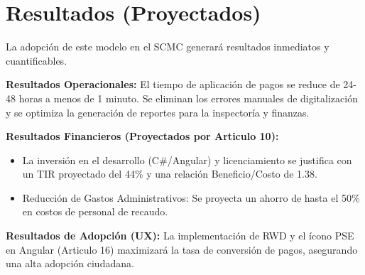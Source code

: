 \section{Resultados (Proyectados)}
La adopción de este modelo en el SCMC generará resultados inmediatos y cuantificables.

\textbf{Resultados Operacionales:} El tiempo de aplicación de pagos se reduce de 24-48 horas a menos de 1 minuto. Se eliminan los errores manuales de digitalización y se optimiza la generación de reportes para la inspectoría y finanzas.

\textbf{Resultados Financieros (Proyectados por Articulo 10):}
\begin{itemize}
    \item La inversión en el desarrollo (C\#/Angular) y licenciamiento se justifica con un TIR proyectado del 44\% y una relación Beneficio/Costo de 1.38.
    \item Reducción de Gastos Administrativos: Se proyecta un ahorro de hasta el 50\% en costos de personal de recaudo.
\end{itemize}

\textbf{Resultados de Adopción (UX):} La implementación de RWD y el ícono PSE en Angular (Articulo 16) maximizará la tasa de conversión de pagos, asegurando una alta adopción ciudadana.